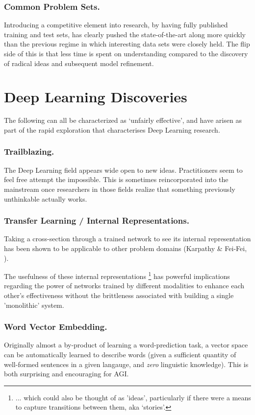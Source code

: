 \documentclass[citeauthoryear]{llncs}
\begin{document}
\subsubsection*{Common Problem Sets.}

Introducing a competitive element into research, by having fully published
training and test sets, has clearly pushed the state-of-the-art along more 
quickly than the previous regime in which interesting data sets were closely held.
The flip side of this is that less time is spent on understanding 
compared to the discovery of radical ideas and subsequent model refinement.


\section{Deep Learning Discoveries}

The following can all be characterized as `unfairly effective', and have 
arisen as part of the rapid exploration that characterises Deep Learning research.

\subsubsection*{Trailblazing.}
The Deep Learning field appears wide open to new ideas.  
Practitioners seem to feel free attempt the impossible.  
This is sometimes reincorporated into the mainstream once researchers in those 
fields realize that something previously unthinkable actually works.

\subsubsection*{Transfer Learning / Internal Representations.}
Taking a cross-section through a trained network to see its internal representation
has been shown to be applicable to other problem domains (Karpathy \& Fei-Fei, \cite{karpathy2014deep}).

The usefulness of these internal representations
\footnote{ ... which could also be thought of as 'ideas', particularly 
if there were a means to capture transitions between them, aka `stories'.}
has powerful implications regarding the power of networks trained by 
different modalities to enhance each other's effectiveness without the 
brittleness associated with building a single 'monolithic' system.

\subsubsection*{Word Vector Embedding.}
Originally almost a by-product of learning a word-prediction task, a vector 
space can be automatically learned to describe words (given a sufficient
quantity of well-formed sentences in a given langauge, and \emph{zero} linguistic knowledge).
This is both surprising and encouraging for AGI.
\end{document}
